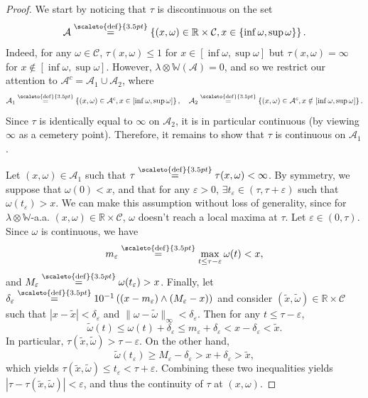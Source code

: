 \documentclass[12pt]{article}
\newcommand{\RR}{\mathbb R}
\newcommand{\1}{\mathds{1}}
\newcommand{\eqdef}{\stackrel{\scaleto{\mathrm{def}}{3.5pt}}{=}}
\numberwithin{equation}{section}
\begin{document}
\begin{proof}
    We start by noticing that $\tau$ is discontinuous on the set
    \begin{equation*}
        \mathcal A\eqdef\left\{(x,\omega)\in\RR\times\mathcal C, x\in\{\inf\omega,\sup\omega\}\right\}.
    \end{equation*}
    Indeed, for any $\omega\in\mathcal C$, $\tau(x,\omega)\le1$ for $x\in[\inf\omega,\sup\omega]$ but $\tau(x,\omega)=\infty$ for $x\notin[\inf\omega,\sup\omega]$. However, $\lambda\otimes\mathbb W(\mathcal A)=0$, and so we restrict our attention to $\mathcal A^c=\mathcal A_1\cup\mathcal A_2$, where 
    \begin{equation*}
        \mathcal A_1\eqdef\left\{(x,\omega)\in\mathcal A^c, x\in[\inf\omega,\sup\omega]\right\},\quad \mathcal A_2\eqdef\left\{(x,\omega)\in\mathcal A^c, x\notin[\inf\omega,\sup\omega]\right\}.
    \end{equation*}
    Since $\tau$ is identically equal to $\infty$ on $\mathcal A_2$, it is in particular continuous (by viewing $\infty$ as a cemetery point). Therefore, it remains to show that $\tau$ is continuous on $\mathcal A_1$.
    
    Let $(x,\omega)\in\mathcal A_1$ such that $\tau\eqdef\tau(x,\omega)<\infty$. By symmetry, we suppose that $\omega(0)<x$, and that for any $\varepsilon>0$, $\exists t_\varepsilon\in(\tau,\tau+\varepsilon)$ such that $\omega(t_\varepsilon)>x$. We can make this assumption without loss of generality, since for $\lambda\otimes\mathbb W$-a.a. $(x,\omega)\in\RR\times\mathcal C$, $\omega$ doesn't reach a local maxima at $\tau$. Let $\varepsilon\in(0,\tau)$. Since $\omega$ is continuous, we have 
    \begin{equation*}
        m_\varepsilon\eqdef\max_{t\le\tau-\varepsilon}\omega(t)<x,
    \end{equation*}
    and $M_\varepsilon\eqdef\omega(t_\varepsilon)>x$. Finally, let $\delta_\varepsilon\eqdef10^{-1}\left((x-m_\varepsilon)\wedge (M_\varepsilon-x)\right)$ and consider $(\widetilde x,\widetilde\omega)\in\RR\times\mathcal C$ such that $|x-\widetilde x|<\delta_\varepsilon$ and $\lVert\omega-\widetilde\omega\lVert_\infty<\delta_\varepsilon$. Then for any $t\le\tau-\varepsilon$,
    \begin{equation*}
        \widetilde\omega(t)\le\omega(t)+\delta_\varepsilon\le m_\varepsilon+\delta_\varepsilon<x-\delta_\varepsilon<\widetilde x.
    \end{equation*}
    In particular, $\tau(\widetilde x,\widetilde\omega)>\tau-\varepsilon$. On the other hand,
    \begin{equation*}
        \widetilde\omega(t_\varepsilon)\ge M_\varepsilon-\delta_\varepsilon>x+\delta_\varepsilon>\widetilde x,
    \end{equation*}
    which yields $\tau(\widetilde x,\widetilde\omega)\le t_\varepsilon<\tau+\varepsilon$. Combining these two inequalities yields $|\tau-\tau(\widetilde x,\widetilde\omega)|<\varepsilon$, and thus the continuity of $\tau$ at $(x,\omega)$.
\end{proof}
\end{document}
